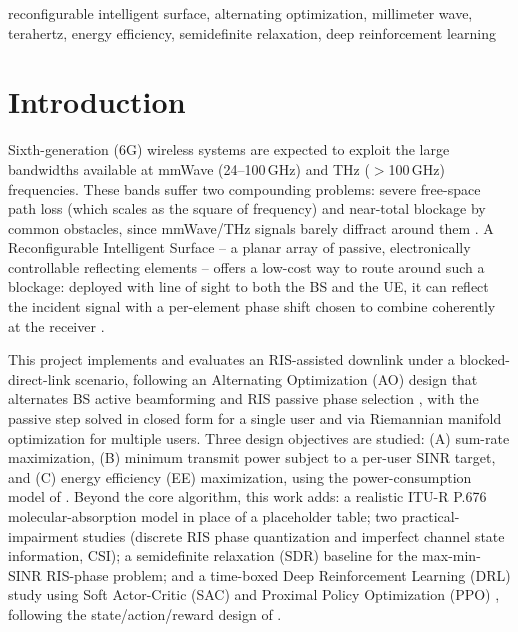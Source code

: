 \documentclass[conference]{IEEEtran}
\newcommand{\IRS}{RIS}
\begin{document}
\begin{IEEEkeywords}
reconfigurable intelligent surface, alternating optimization, millimeter
wave, terahertz, energy efficiency, semidefinite relaxation, deep
reinforcement learning
\end{IEEEkeywords}

\section{Introduction}

Sixth-generation (6G) wireless systems are expected to exploit the large
bandwidths available at mmWave (24--100\,GHz) and THz ($>$100\,GHz)
frequencies. These bands suffer two compounding problems: severe
free-space path loss (which scales as the square of frequency) and
near-total blockage by common obstacles, since mmWave/THz signals barely
diffract around them \cite{direnzo2020smart}. A Reconfigurable
Intelligent Surface -- a planar array of passive, electronically
controllable reflecting elements -- offers a low-cost way to route
around such a blockage: deployed with line of sight to both the BS and
the UE, it can reflect the incident signal with a per-element phase
shift chosen to combine coherently at the receiver
\cite{wu2019intelligent,wu2020towards}.

This project implements and evaluates an \IRS{}-assisted downlink under
a blocked-direct-link scenario, following an Alternating Optimization
(AO) design that alternates BS active beamforming and \IRS{} passive
phase selection \cite{wu2019intelligent}, with the passive step solved
in closed form for a single user and via Riemannian manifold
optimization \cite{yu2019miso,boumal2014manopt} for multiple users. Three
design objectives are studied: (A) sum-rate maximization, (B) minimum
transmit power subject to a per-user SINR target, and (C) energy
efficiency (EE) maximization, using the power-consumption model of
\cite{huang2019ee}. Beyond the core algorithm, this work adds: a
realistic ITU-R P.676 molecular-absorption model in place of a
placeholder table; two practical-impairment studies (discrete \IRS{}
phase quantization and imperfect channel state information, CSI); a
semidefinite relaxation (SDR) baseline \cite{luo2010sdr} for the
max-min-SINR \IRS{}-phase problem; and a time-boxed Deep Reinforcement
Learning (DRL) study using Soft Actor-Critic (SAC)
\cite{haarnoja2018sac} and Proximal Policy Optimization (PPO)
\cite{schulman2017ppo}, following the state/action/reward design of
\cite{huang2020drl}.
\end{document}
